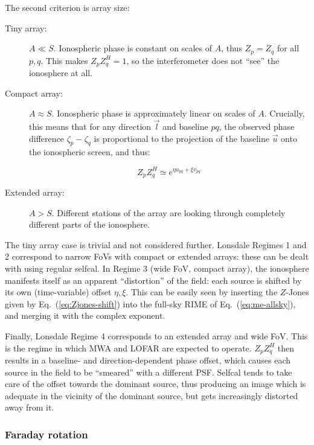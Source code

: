 \documentclass[referee]{aa}
\newcommand{\herm}{H}
\begin{document}
The second criterion is array size:

\begin{description}
\item[Tiny array:] $A\ll S$. Ionospheric phase is constant on scales of $A$, thus $Z_p=Z_q$ for all $p,q$. This makes $Z_p Z^\herm_q=1$, so the interferometer does not ``see'' the ionosphere at all.
\item[Compact array:] $A\approx S$. Ionospheric phase is approximately linear on scales of $A$. Crucially, this means that for any direction $\vec l$ and baseline $pq$, the observed phase difference $\zeta_p-\zeta_q$ is proportional to the projection of the baseline $\vec u$ onto the ionospheric screen, and thus:

\begin{equation}\label{eq:Zjones-shift}
Z_p Z^\herm_q \simeq e^{\eta u_{pq} + \xi v_{pq}}
\end{equation}

\item[Extended array:] $A>S$. Different stations of the array are looking through completely different parts of the ionosphere.
\end{description}

The tiny array case is trivial and not considered further. Lonsdale Regimes 1 and 2 correspond to narrow FoVs with compact or extended arrays: these can be dealt with using regular selfcal. In Regime 3 (wide FoV, compact array), the ionosphere manifests itself as an apparent ``distortion'' of the field: each source is shifted by its own (time-variable) offset $\eta,\xi$. This can be easily seen by inserting the $Z$-Jones given by Eq.~(\ref{eq:Zjones-shift}) into the full-sky RIME of Eq.~(\ref{eq:me-allsky}), and merging it with the complex exponent. 

Finally, Lonsdale Regime 4 corresponds to an extended array and wide FoV. This is the regime in which MWA and LOFAR are expected to operate. $Z_p Z^\herm_q$ then results in a baseline- and direction-dependent phase offset, which causes each source in the field to be ``smeared'' with a different PSF. Selfcal tends to take care of the offset towards the dominant source, thus producing an image which is adequate in the vicinity of the dominant source, but gets increasingly distorted away from it. 


\subsubsection{Faraday rotation\label{sec:DFR}\label{sec:FR}}
\end{document}
